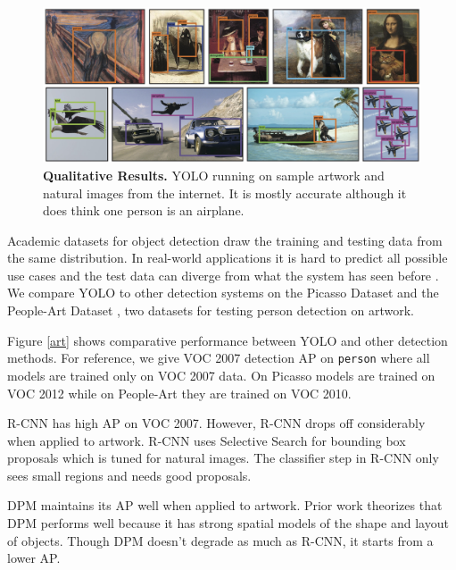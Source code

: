 \documentclass[10pt,twocolumn,letterpaper]{article}
\begin{document}
\begin{figure}[t]
\begin{center}
    \includegraphics[width=\linewidth]{art.jpg}
\end{center}
   \caption{\small \textbf{Qualitative Results.} YOLO running on sample artwork and natural images from the internet. It is mostly accurate although it does think one person is an airplane.}
\label{images}
\end{figure}

Academic datasets for object detection draw the training and testing data from the same distribution. In real-world applications it is hard to predict all possible use cases and the test data can diverge from what the system has seen before \cite{cai2015cross}. 
We compare YOLO to other detection systems on the Picasso Dataset \cite{ginosar2014detecting} and the People-Art Dataset \cite{cai2015cross}, two datasets for testing person detection on artwork.

Figure \ref{art} shows comparative performance between YOLO and other detection methods. For reference, we give VOC 2007 detection AP on \texttt{person} where all models are trained only on VOC 2007 data. On Picasso models are trained on VOC 2012 while on People-Art they are trained on VOC 2010.

R-CNN has high AP on VOC 2007. However, R-CNN drops off considerably when applied to artwork. R-CNN uses Selective Search for bounding box proposals which is tuned for natural images. The classifier step in R-CNN only sees small regions and needs good proposals.

DPM maintains its AP well when applied to artwork. Prior work theorizes that DPM performs well because it has strong spatial models of the shape and layout of objects. Though DPM doesn't degrade as much as R-CNN, it starts from a lower AP.
\end{document}
